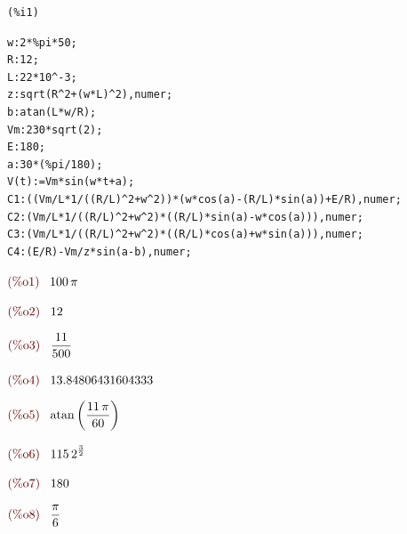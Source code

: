 \documentclass{article}
\begin{document}
\noindent
\begin{minipage}[t]{8ex}{\color{red}\bf
\begin{verbatim}
(%i1) 
\end{verbatim}}
\end{minipage}
\begin{minipage}[t]{\textwidth}{\color{blue}
\begin{verbatim}
w:2*%pi*50;
R:12;
L:22*10^-3;
z:sqrt(R^2+(w*L)^2),numer;
b:atan(L*w/R);
Vm:230*sqrt(2);
E:180;
a:30*(%pi/180);
V(t):=Vm*sin(w*t+a);
C1:((Vm/L*1/((R/L)^2+w^2))*(w*cos(a)-(R/L)*sin(a))+E/R),numer;
C2:(Vm/L*1/((R/L)^2+w^2)*((R/L)*sin(a)-w*cos(a))),numer;
C3:(Vm/L*1/((R/L)^2+w^2)*((R/L)*cos(a)+w*sin(a))),numer;
C4:(E/R)-Vm/z*sin(a-b),numer;
\end{verbatim}}
\end{minipage}
\begin{math}\displaystyle
\parbox{8ex}{\color{labelcolor}(\%o1) }
100\,\pi 
\end{math}

\begin{math}\displaystyle
\parbox{8ex}{\color{labelcolor}(\%o2) }
12
\end{math}

\begin{math}\displaystyle
\parbox{8ex}{\color{labelcolor}(\%o3) }
\frac{11}{500}
\end{math}

\begin{math}\displaystyle
\parbox{8ex}{\color{labelcolor}(\%o4) }
13.84806431604333
\end{math}

\begin{math}\displaystyle
\parbox{8ex}{\color{labelcolor}(\%o5) }
\mathrm{atan}\left( \frac{11\,\pi }{60}\right) 
\end{math}

\begin{math}\displaystyle
\parbox{8ex}{\color{labelcolor}(\%o6) }
115\,{2}^{\frac{3}{2}}
\end{math}

\begin{math}\displaystyle
\parbox{8ex}{\color{labelcolor}(\%o7) }
180
\end{math}

\begin{math}\displaystyle
\parbox{8ex}{\color{labelcolor}(\%o8) }
\frac{\pi }{6}
\end{math}
\end{document}
